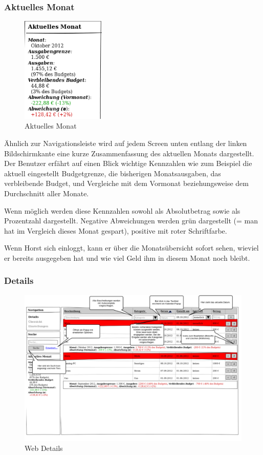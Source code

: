 \subsubsection{Aktuelles Monat} \label{subsubsection:aktuelles_monat}

\begin{figure}[htl]
\centering
\includegraphics[width=4cm]{img/web_current_month}
\caption{Aktuelles Monat}
\label{fig:web_current_month}
\end{figure}

\"Ahnlich zur Navigationsleiste wird auf jedem Screen unten entlang der linken
Bildschirmkante eine kurze Zusammenfassung des aktuellen Monats dargestellt.
Der Benutzer erfährt auf einen Blick wichtige Kennzahlen wie zum Beispiel die
aktuell eingestellt Budgetgrenze, die bisherigen Monatsausgaben, das
verbleibende Budget, und Vergleiche mit dem Vormonat beziehungsweise dem
Durchschnitt aller Monate.

Wenn möglich werden diese Kennzahlen sowohl als Absolutbetrag sowie als
Prozentzahl dargestellt. Negative Abweichungen werden grün dargestellt (= man
hat im Vergleich dieses Monat gespart), positive mit roter Schriftfarbe.

Wenn Horst sich einloggt, kann er über die Monats\"ubersicht sofort sehen,
wieviel er bereits ausgegeben hat und wie viel Geld ihm in diesem Monat noch
bleibt.

\subsubsection{Details}

\begin{figure}[htl]
\centering
\includegraphics[width=\textwidth]{img/web_details}
\caption{Web Details}
\label{fig:web_details}
\end{figure}

